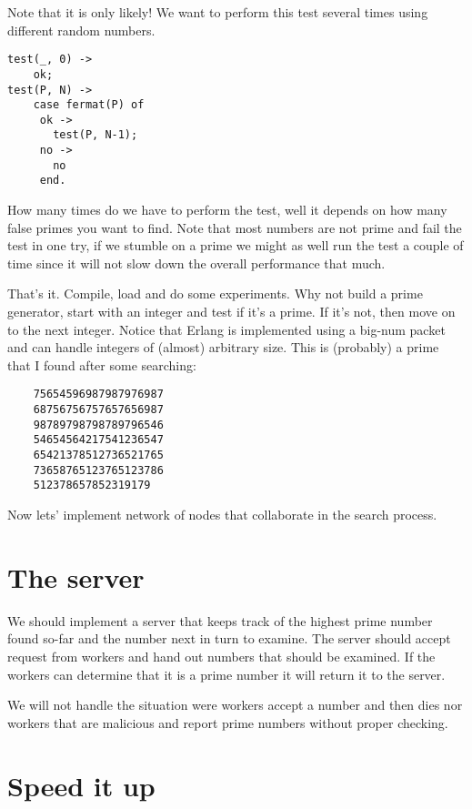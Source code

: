 \documentclass[a4paper,11pt]{article}
\begin{document}
Note that it is only likely! We want to perform this test several times 
using different random numbers. 

\begin{verbatim}	    
test(_, 0) ->
    ok;
test(P, N) ->
    case fermat(P) of
     ok ->
       test(P, N-1);
     no ->
       no
     end.
\end{verbatim}	    

How many times do we have to perform the test, well it depends on how
many false primes you want to find. Note that most numbers are not
prime and fail the test in one try, if we stumble on a prime we might
as well run the test a couple of time since it will not slow down the
overall performance that much. 


That's it. Compile, load and do some experiments. Why not build a
prime generator, start with an integer and test if it's a prime. If
it's not, then move on to the next integer. Notice that Erlang is
implemented using a big-num packet and can handle integers of (almost)
arbitrary size. This is (probably) a prime that I found after some
searching:

\begin{verbatim}
    75654596987987976987
    68756756757657656987
    98789798798789796546
    54654564217541236547
    65421378512736521765
    73658765123765123786
    512378657852319179
\end{verbatim}

Now lets' implement network of nodes that collaborate in the search process.

\section{The server}

We should implement a server that
keeps track of the highest prime number found so-far and the number
next in turn to examine. The server should accept request from workers
and hand out numbers that should be examined. If the workers can
determine that it is a prime number it will return it to the server. 

We will not handle the situation were workers accept a number and then
dies nor workers that are malicious and report prime numbers without
proper checking.

\section{Speed it up}
\end{document}
